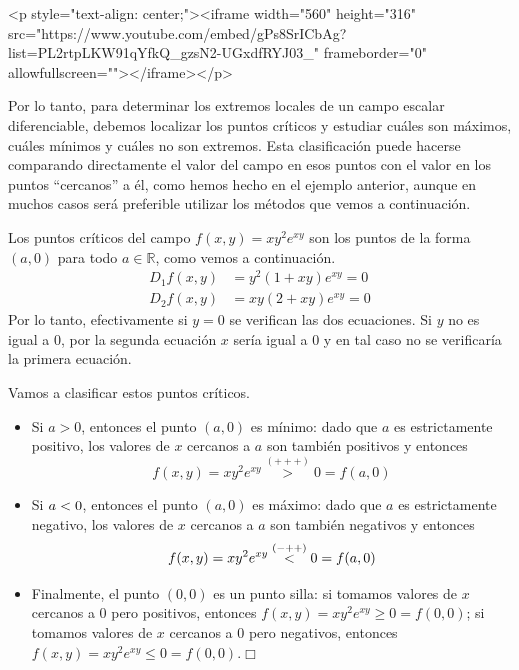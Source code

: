 \begin{rawhtml}
<p style="text-align: center;"><iframe width="560" height="316" src="https://www.youtube.com/embed/gPs8SrICbAg?list=PL2rtpLKW91qYfkQ_gzsN2-UGxdfRYJ03_" frameborder="0" allowfullscreen=""></iframe></p>
\end{rawhtml}

Por lo tanto, para determinar los extremos locales de un
campo escalar diferenciable,  debemos localizar los puntos críticos y estudiar cuáles son máximos, cuáles mínimos y cuáles no son extremos.
Esta clasificación puede hacerse comparando directamente el valor del campo en esos puntos con el valor en los puntos ``cercanos'' a él, como hemos hecho en el ejemplo anterior, aunque en muchos casos será preferible utilizar los métodos que vemos a continuación.

\newpage
\begin{ejemplo}
Los puntos críticos del campo $f(x,y)=xy^2e^{xy}$ son los puntos de la forma $(a,0)$ para todo $a\in\mathbb{R}$, como vemos a continuación.
\begin{align*}
D_1f(x,y)&=y^2(1+xy)e^{xy} = 0 \\
D_2f(x,y)&=xy(2+xy)e^{xy} = 0
\end{align*}
Por lo tanto, efectivamente si $y=0$ se verifican las dos ecuaciones. 
Si $y$ no es igual a $0$, por la segunda ecuación $x$ sería igual a $0$ y en tal caso no se verificaría la primera ecuación.

Vamos a clasificar estos puntos críticos.
\begin{itemize}
\item
Si $a>0$, entonces el punto $(a,0)$ es mínimo: dado que $a$ es estrictamente positivo, los valores de $x$ cercanos a $a$ son también positivos y entonces 
\[
f(x,y)=xy^2e^{xy}\stackrel{(+++)}{>}0=f(a,0)
\]
\item
Si $a< 0$, entonces el punto $(a,0)$ es máximo: dado que $a$ es estrictamente negativo, los valores de $x$ cercanos a $a$ son también negativos y entonces 
\[
f(x,y)=xy^2e^{xy}\stackrel{(-++)}{< }0=f(a,0)
\]
\item
Finalmente, el punto $(0,0)$ es un punto silla: si tomamos valores de $x$ cercanos a $0$ pero positivos, entonces $f(x,y)=xy^2e^{xy}\ge 0 = f(0,0)$;
si tomamos valores de $x$ cercanos a $0$ pero negativos, entonces $f(x,y)=xy^2e^{xy}\le 0 = f(0,0)$.\hfill$\Box$
\end{itemize}
\end{ejemplo}

